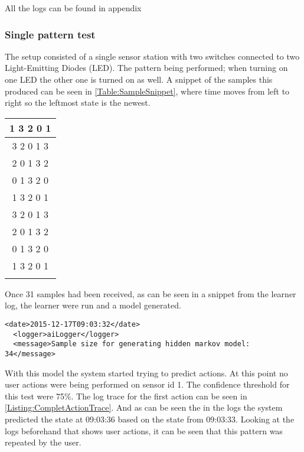 All the logs can be found in appendix 
\subsubsection{Single pattern test}
The setup consisted of a single sensor station with two switches connected to two Light-Emitting Diodes (LED). The pattern being performed; when turning on one LED the other one is turned on as well. A snippet of the samples this produced can be seen in \cref{Table:SampleSnippet}, where time moves from left to right so the leftmost state is the newest.
\begin{center}
	\begin{tabular}{ | c | }
			\hline
		1 3 2 0 1 \\ \hline
		3 2 0 1 3 \\ \hline
		2 0 1 3 2 \\ \hline
		0 1 3 2 0 \\ \hline
		1 3 2 0 1 \\ \hline
		3 2 0 1 3 \\ \hline
		2 0 1 3 2 \\ \hline
		0 1 3 2 0 \\ \hline
		1 3 2 0 1 \\ \hline
			\hline
	\label{Table:SampleSnippet}
	\caption{Samples from test with simple pattern, as performed by the user}
	\end{tabular}
\end{center}
Once 31 samples had been received, as can be seen in a snippet from the learner log, the learner were run and a model generated.
\lstset{language=xml}
\begin{lstlisting}[label = Listing:MarkovGenLog, caption = Snippet of log from model generation]
  <date>2015-12-17T09:03:32</date>
  <logger>aiLogger</logger>
  <message>Sample size for generating hidden markov model: 34</message>
\end{lstlisting}
With this model the system started trying to predict actions. At this point no user actions were being performed on sensor id 1. The confidence threshold for this test were 75\%. The log trace for the first action can be seen in \cref{Listing:CompletActionTrace}. And as can be seen the in the logs the system predicted the state at 09:03:36 based on the state from 09:03:33. Looking at the logs beforehand that shows user actions, it can be seen that this pattern was repeated by the user.

